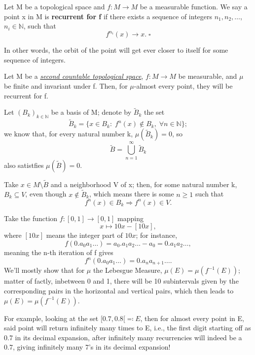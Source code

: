 \documentclass[../fractals_everywhere.tex]{subfiles}
\begin{document}
\begin{def*}
	Let M be a topological space and \(f:M\rightarrow M\) be a measurable function. We say a point x in M is \textbf{recurrent for f} if there exists a sequence of integers \(n_1, n_2, \dotsc \), \(n_{i}\in \mathbb{N}\), such that
	\[
		f^{n_{i}}(x)\rightarrow x. \; \square
	\]
\end{def*}
In other words, the orbit of the point will get ever closer to itself for some sequence of integers.

\begin{theorem*}
	Let M be a \hyperlink{2nd_countable}{\textit{second countable topological space}}, \(f:M\rightarrow M\) be measurable, and \(\mu \) be finite and invariant under f. Then, for \(\mu \)-almost every point, they will be recurrent for f.
\end{theorem*}
\begin{proof*}
	Let \((B_{k})_{k\in \mathbb{N}}\) be a basis of M; denote by \(\tilde{B}_{k}\) the set
	\[
		\tilde{B}_{k} = \{x\in B_{k}:\; f^{n}(x)\not\in B_{k},\; \forall n\in \mathbb{N}\};
	\]
	we know that, for every natural number k, \(\mu (\tilde{B}_{k}) = 0\), so
	\[
		\tilde{B} = \bigcup_{n=1}^{\infty}\tilde{B}_{k}
	\]
	also satistfies \(\mu (\tilde{B})=0.\)

	Take \(x\in M\setminus{\tilde{B}}\) and a neighborhood V of x; then, for some natural number k, \(B_{k}\subseteq V\), even though \(x\not\in \tilde{B}_{k}\), which means there is some \(n\geq 1\) such that
	\[
		f^{n}(x)\in B_{k} \Rightarrow f^{n}(x)\in V.
	\]
\end{proof*}
\begin{example}
	Take the function \(f:[0, 1]\rightarrow [0, 1]\) mapping
	\[
		x\mapsto 10x - [10x],
	\]
	where \([10x]\) means the integer part of \(10x\); for instance,
	\[
		f(0.a_{0}a_{1}\dotsc ) = a_{0}.a_{1}a_{2}\dotsc -a_{0}=0.a_{1}a_{2}\dotsc,
	\]
	meaning the n-th iteration of f gives
	\[
		f^{n}(0.a_{0}a_{1}\dotsc ) = 0.a_{n}a_{n+1}\dotsc .
	\]
	We'll mostly show that for \(\mu \) the Lebesgue Measure, \(\mu (E) = \mu (f^{-1}(E))\); matter of factly, inbetween 0 and 1, there will be 10 subintervals given by the corresponding pairs in the horizontal and vertical pairs, which then leads to \(\mu (E) = \mu (f^{-1}(E))\).

	For example, looking at the set \([0.7, 0.8[ \eqqcolon E\), then for almost every point in E, said point will return infinitely many times to E, i.e., the first digit starting off as 0.7 in its decimal expansion, after infinitely many recurrencies will indeed be a 0.7, giving infinitely many 7's in its decimal expansion!
\end{example}
\end{document}
